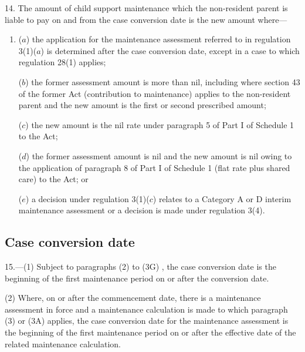 \documentclass[12pt,a4paper]{article}
\begin{document}
14.  The amount of child support maintenance which the non-resident parent is liable to pay on and from the case conversion date is the new amount where—
\begin{enumerate}\item[]
($a$) the application for the maintenance assessment referred to in regulation 3(1)($a$)  is determined after the case conversion date, except in a case to which regulation 28(1) applies;

($b$) the former assessment amount is more than nil, including where section 43 of the former Act (contribution to maintenance) applies to the non-resident parent and the new amount is the first or second prescribed amount;

($c$) the new amount is the nil rate under paragraph 5 of Part I of Schedule 1 to the Act; 

($d$) the former assessment amount is nil and the new amount is nil owing to the application of paragraph 8 of Part I of Schedule 1 (flat rate plus shared care) to the Act; or

($e$) a decision under regulation 3(1)($c$)  relates to a Category A or D interim maintenance assessment or a decision is made under regulation 3(4).
\end{enumerate}


\subsection[15. Case conversion date]{Case conversion date}

15.---(1)  Subject to 
paragraphs (2) to (3G)%
, the case conversion date is the beginning of the first maintenance period on or after the conversion date.

(2) Where, on or after the commencement date, there is a maintenance assessment in force and a maintenance calculation is made to which paragraph (3) 
or (3A)  %
applies, the case conversion date for the maintenance assessment 
is  %
the beginning of the first maintenance period on or after the effective date of the related maintenance calculation.
\end{document}
